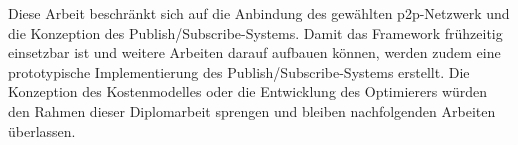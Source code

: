 Diese Arbeit beschränkt sich auf die Anbindung des gewählten \ac{p2p}-Netzwerk und die Konzeption des Publish/Subscribe-Systems. Damit das Framework frühzeitig einsetzbar ist und weitere Arbeiten darauf aufbauen können, werden zudem eine prototypische Implementierung des Publish/Subscribe-Systems erstellt. Die Konzeption des Kostenmodelles oder die Entwicklung des Optimierers würden den Rahmen dieser Diplomarbeit sprengen und bleiben nachfolgenden Arbeiten überlassen.
